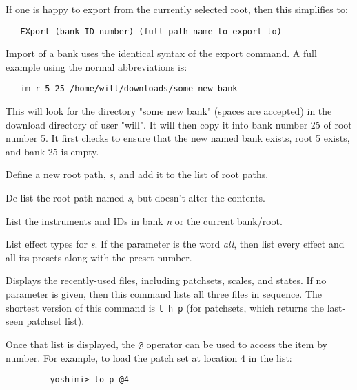    If one is happy to export from the currently selected root, then this
   simplifies to:

\begin{verbatim}
   EXport (bank ID number) (full path name to export to)
\end{verbatim}

      Import of a bank uses the identical syntax of the export command.
      A full example using the normal abbreviations is:

\begin{verbatim}
   im r 5 25 /home/will/downloads/some new bank
\end{verbatim}

      This will look for the directory "some new bank" (spaces are accepted)
      in the download directory of user "will". It will then copy it into
      bank number 25 of root number 5. It first checks to ensure that the new
      named bank exists, root 5 exists, and bank 25 is empty.

      Define a new root path, \textsl{s}, and add it to the list of root
      paths.

      De-list the root path named \textsl{s}, but doesn't alter the contents.

      List the instruments and IDs in bank \textsl{n} or the
      current bank/root.

      List effect types for \textsl{s}.
      If the parameter is the word \textsl{all},
      then list every effect and all its
      presets along with the preset number.

      Displays the recently-used files, including patchsets, scales, and
      states.  If no parameter is given, then this command lists all three
      files in sequence.  The shortest version of this command is
      \texttt{l h p} (for patchsets, which returns the last-seen patchset
      list).

      Once that list is displayed,
      the \texttt{@} operator can be used to access
      the item by number.  For example, to load the patch set at location 4
      in the list:

      \begin{verbatim}
         yoshimi> lo p @4
      \end{verbatim}

